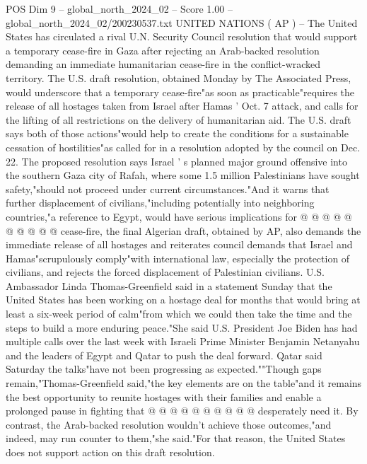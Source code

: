 \begin{textsample}{POS Dim 9 – global\_north\_2024\_02 – Score 1.00 – global\_north\_2024\_02/200230537.txt}  \label{ex:f9_pos_215}
UNITED NATIONS ( AP ) -- The United States has circulated a rival U.N.
Security Council resolution that would support a temporary cease-fire in Gaza after rejecting an Arab-backed resolution demanding an immediate humanitarian cease-fire in the conflict-wracked territory.
The U.S. draft resolution, obtained Monday by The Associated Press, would underscore that a temporary cease-fire"as soon as practicable"requires the release of all hostages taken from Israel after Hamas ' Oct. 7 attack, and calls for the lifting of all restrictions on the delivery of humanitarian aid.
The U.S. draft says both of those actions"would help to create the conditions for a sustainable cessation of hostilities"as called for in a resolution adopted by the council on Dec. 22.
The proposed resolution says Israel ' s planned major ground offensive into the southern Gaza city of Rafah, where some 1.5 million Palestinians have sought safety,"should not proceed under current circumstances."And it warns that further displacement of civilians,"including potentially into neighboring countries,"a reference to Egypt, would have serious implications for @ @ @ @ @ @ @ @ @ @ cease-fire, the final Algerian draft, obtained by AP, also demands the immediate release of all hostages and reiterates council demands that Israel and Hamas"scrupulously comply"with international law, especially the protection of civilians, and rejects the forced displacement of Palestinian civilians.
U.S.
Ambassador Linda Thomas-Greenfield said in a statement Sunday that the United States has been working on a hostage deal for months that would bring at least a six-week period of calm"from which we could then take the time and the steps to build a more enduring peace."She said U.S.
President Joe Biden has had multiple calls over the last week with Israeli Prime Minister Benjamin Netanyahu and the leaders of Egypt and Qatar to push the deal forward.
Qatar said Saturday the talks"have not been progressing as expected.""Though gaps remain,"Thomas-Greenfield said,"the key elements are on the table"and it remains the best opportunity to reunite hostages with their families and enable a prolonged pause in fighting that @ @ @ @ @ @ @ @ @ @ desperately need it.
By contrast, the Arab-backed resolution wouldn't achieve those outcomes,"and indeed, may run counter to them,"she said."For that reason, the United States does not support action on this draft resolution.

\end{textsample}
